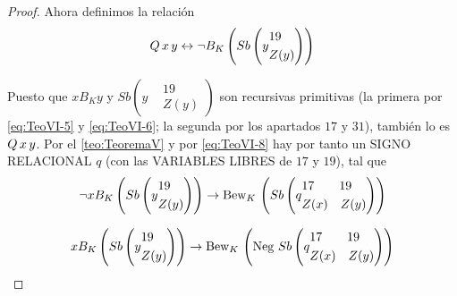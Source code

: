 \begin{proof}
    Ahora definimos la relación 
    \begin{equation} \label{eq:TeoVI-8.1}
        Q \thinspace x \thinspace y \leftrightarrow \lnot B_K \left( Sb\left(y
            \begin{aligned}
                &19 \\
                &Z(y)
            \end{aligned}
        \right)\right)
    \end{equation}

    Puesto que $x B_K y$ y $Sb\left(y 
        \begin{aligned}
            &19 \\
            &Z(y)
        \end{aligned}
    \right)$ son recursivas primitivas (la primera por \eqref{eq:TeoVI-5} y \eqref{eq:TeoVI-6}; la segunda por los apartados $17$ y $31$), también lo es 
    $Q \thinspace x \thinspace y$. Por el \autoref{teo:TeoremaV} y por \eqref{eq:TeoVI-8} hay por tanto un SIGNO RELACIONAL $q$ (con las VARIABLES LIBRES 
    de $17$ y $19$), tal que
    \begin{equation} \label{eq:TeoVI-9}
        \lnot x B_K \left( Sb\left(y 
        \begin{aligned}
            &19 \\
            &Z(y)
        \end{aligned}
        \right)\right) \rightarrow \text{Bew}_K \thinspace \left( Sb\left(q 
        \begin{aligned}
            &17 \qquad 19 \\
            &Z(x)\quad Z(y)
        \end{aligned}
        \right)\right)
    \end{equation}

    \begin{equation} \label{eq:TeoVI-10}
        x B_K \left( Sb\left(y 
        \begin{aligned}
            &19 \\
            &Z(y)
        \end{aligned}
        \right)\right) \rightarrow \text{Bew}_K \thinspace \left(\text{Neg } Sb\left(q 
        \begin{aligned}
            &17 \qquad 19 \\
            &Z(x)\quad Z(y)
        \end{aligned}
        \right)\right)
    \end{equation}


\end{proof}
